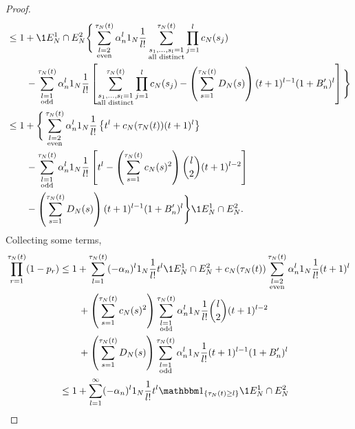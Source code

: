 \begin{proof}
\begin{align*}
&\leq 1 + \1{E_N^1 \cap E_N^2} \Bigg\{ 
        \sum_{\substack{l=2 \\ \text{even} }}^{\tau_N(t)} 
        \alpha_n^l \ON \frac{1}{l!} 
        \sum_{\substack{ s_1, \dots, s_l =1 \\ \text{all distinct} }}^{\tau_N(t)}
        \prod_{j=1}^l c_N(s_j) \\
    &\qquad- \sum_{\substack{l=1 \\ \text{odd} }}^{\tau_N(t)} 
        \alpha_n^l \ON \frac{1}{l!} 
        \left[ \sum_{\substack{ s_1, \dots, s_l =1 \\ \text{all distinct} }}^{\tau_N(t)}
        \prod_{j=1}^l c_N(s_j)
        - \left( \sum_{s=1}^{\tau_N(t)} D_N(s) \right) 
        (t+1)^{l-1} (1+B_n^\prime)^l \right] \Bigg\} \\
&\leq 1 + \Bigg\{ \sum_{\substack{l=2 \\ \text{even} }}^{\tau_N(t)} 
        \alpha_n^l \ON \frac{1}{l!} 
        \left\{ t^l + c_N(\tau_N(t)) (t+1)^l \right\} \\
    &\qquad- \sum_{\substack{l=1 \\ \text{odd} }}^{\tau_N(t)} 
        \alpha_n^l \ON \frac{1}{l!} 
        \left[ t^l - \left( \sum_{s=1}^{\tau_N(t)} c_N(s)^2 \right) 
        \binom{l}{2} (t+1)^{l-2} \right] \\
    &\qquad- \left( \sum_{s=1}^{\tau_N(t)} D_N(s) \right) 
        (t+1)^{l-1} (1+B_n^\prime)^l \Bigg\} \1{E_N^1 \cap E_N^2} .
\end{align*}
Collecting some terms,
\begin{align}
\prod_{r=1}^{\tau_N(t)} (1-p_r)
&\leq 1+ \sum_{l=1}^{\tau_N(t)} (-\alpha_n)^l \ON \frac{1}{l!} t^l 
        \1{E_N^1 \cap E_N^2}
        + c_N(\tau_N(t)) \sum_{\substack{l=2 \\ \text{even} }}^{\tau_N(t)}
        \alpha_n^l \ON \frac{1}{l!} (t+1)^l \notag\\
    &\qquad+ \left( \sum_{s=1}^{\tau_N(t)} c_N(s)^2 \right)
        \sum_{\substack{l=1 \\ \text{odd} }}^{\tau_N(t)} \alpha_n^l
        \ON \frac{1}{l!} \binom{l}{2} (t+1)^{l-2} \notag\\
    &\qquad+ \left( \sum_{s=1}^{\tau_N(t)} D_N(s) \right) 
        \sum_{\substack{l=1 \\ \text{odd} }}^{\tau_N(t)} \alpha_n^l
        \ON \frac{1}{l!} (t+1)^{l-1} (1+B_n^\prime)^l \notag\\
&\leq 1+ \sum_{l=1}^{\infty} (-\alpha_n)^l \ON \frac{1}{l!} t^l
        \I{\tau_N(t) \geq l} \1{E_N^1 \cap E_N^2}

\end{align}
\end{proof}
